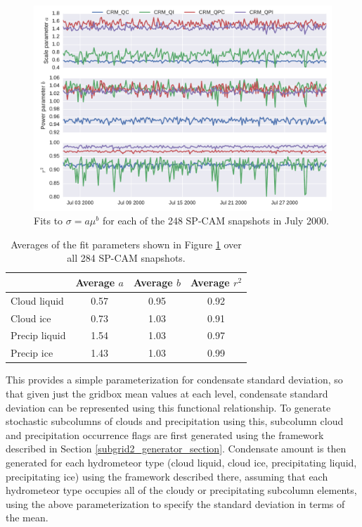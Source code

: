 \begin{figure}
\centering
\includegraphics[width=\columnwidth]{graphics/subgrid2_mxratio_variance_fits.pdf}
\caption{Fits to $\sigma = a \mu^b$ for each of the 248 SP-CAM snapshots in July 2000.}
\label{subgrid2_mxratio_variance_fits}
\end{figure}

\begin{table}
\centering
\begin{tabular}{lccc}
                & Average $a$  & Average $b$  & Average $r^2$ \\ \hline
Cloud liquid    & 0.57 & 0.95 & 0.92 \\
Cloud ice       & 0.73 & 1.03 & 0.91 \\
Precip liquid   & 1.54 & 1.03 & 0.97 \\
Precip ice      & 1.43 & 1.03 & 0.99 \\
\end{tabular}
\caption{Averages of the fit parameters shown in Figure \ref{subgrid2_mxratio_variance_fits} over all 284 SP-CAM snapshots.}
\label{subgrid2_mxratio_variance_fits_table}
\end{table}

This provides a simple parameterization for condensate standard deviation, so that given just the gridbox mean values at each level, condensate standard deviation can be represented using this functional relationship. To generate stochastic subcolumns of clouds and precipitation using this, subcolumn cloud and precipitation occurrence flags are first generated using the framework described in Section \ref{subgrid2_generator_section}. Condensate amount is then generated for each hydrometeor type (cloud liquid, cloud ice, precipitating liquid, precipitating ice) using the framework described there, assuming that each hydrometeor type occupies all of the cloudy or precipitating subcolumn elements, using the above parameterization to specify the standard deviation in terms of the mean.

